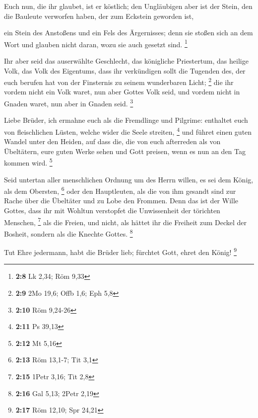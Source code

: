  Euch nun, die ihr glaubet, ist er köstlich; den
Ungläubigen aber ist der Stein, den die Bauleute verworfen haben, der
zum Eckstein geworden ist,

 ein Stein des Anstoßens und ein Fels des Ärgernisses;
denn sie stoßen sich an dem Wort und glauben nicht daran, wozu sie auch
gesetzt sind. \footnote{\textbf{2:8} Lk 2,34; Röm 9,33}

 Ihr aber seid das auserwählte Geschlecht, das königliche
Priestertum, das heilige Volk, das Volk des Eigentums, dass ihr
verkündigen sollt die Tugenden des, der euch berufen hat von der
Finsternis zu seinem wunderbaren Licht; \footnote{\textbf{2:9} 2Mo 19,6;
  Offb 1,6; Eph 5,8}  die ihr vordem nicht ein Volk
waret, nun aber Gottes Volk seid, und vordem nicht in Gnaden waret, nun
aber in Gnaden seid. \footnote{\textbf{2:10} Röm 9,24-26}

 Liebe Brüder, ich ermahne euch als die Fremdlinge und
Pilgrime: enthaltet euch von fleischlichen Lüsten, welche wider die
Seele streiten, \footnote{\textbf{2:11} Ps 39,13}  und
führet einen guten Wandel unter den Heiden, auf dass die, die von euch
afterreden als von Übeltätern, eure guten Werke sehen und Gott preisen,
wenn es nun an den Tag kommen wird. \footnote{\textbf{2:12} Mt 5,16}

 Seid untertan aller menschlichen Ordnung um des Herrn
willen, es sei dem König, als dem Obersten, \footnote{\textbf{2:13} Röm
  13,1-7; Tit 3,1}  oder den Hauptleuten, als die von ihm
gesandt sind zur Rache über die Übeltäter und zu Lobe den Frommen.
 Denn das ist der Wille Gottes, dass ihr mit Wohltun
verstopfet die Unwissenheit der törichten Menschen, \footnote{\textbf{2:15}
  1Petr 3,16; Tit 2,8}  als die Freien, und nicht, als
hättet ihr die Freiheit zum Deckel der Bosheit, sondern als die Knechte
Gottes. \footnote{\textbf{2:16} Gal 5,13; 2Petr 2,19}

 Tut Ehre jedermann, habt die Brüder lieb; fürchtet Gott,
ehret den König! \footnote{\textbf{2:17} Röm 12,10; Spr 24,21}

